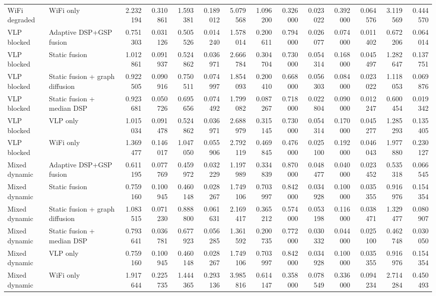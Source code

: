 \begin{tabular}{llrrrrrrrrrrrr}
WiFi degraded & WiFi only & 2.232194 & 0.310861 & 1.593381 & 0.189012 & 5.079568 & 1.096200 & 0.326000 & 0.023022 & 0.392000 & 0.064576 & 3.119569 & 0.444570 \\
VLP blocked & Adaptive DSP+GSP fusion & 0.751303 & 0.031126 & 0.505526 & 0.014240 & 1.578014 & 0.200611 & 0.794000 & 0.026077 & 0.074000 & 0.011402 & 0.672206 & 0.064014 \\
VLP blocked & Static fusion & 1.012861 & 0.091937 & 0.524862 & 0.036971 & 2.666784 & 0.304704 & 0.730000 & 0.054314 & 0.168000 & 0.045497 & 1.282647 & 0.137751 \\
VLP blocked & Static fusion + graph diffusion & 0.922505 & 0.090916 & 0.750511 & 0.074997 & 1.854093 & 0.200410 & 0.668000 & 0.056303 & 0.084000 & 0.023022 & 1.118053 & 0.069876 \\
VLP blocked & Static fusion + median DSP & 0.923681 & 0.050726 & 0.695656 & 0.074492 & 1.799082 & 0.087267 & 0.718000 & 0.022804 & 0.090000 & 0.012247 & 0.600454 & 0.019342 \\
VLP blocked & VLP only & 1.015034 & 0.091478 & 0.524862 & 0.036971 & 2.688979 & 0.315145 & 0.730000 & 0.054314 & 0.170000 & 0.045277 & 1.285293 & 0.135405 \\
VLP blocked & WiFi only & 1.369477 & 0.146017 & 1.047050 & 0.055906 & 2.792119 & 0.469845 & 0.476000 & 0.025100 & 0.192000 & 0.046043 & 1.977880 & 0.230127 \\
Mixed dynamic & Adaptive DSP+GSP fusion & 0.611195 & 0.077769 & 0.459972 & 0.032229 & 1.197989 & 0.334839 & 0.870000 & 0.048477 & 0.040000 & 0.023452 & 0.535318 & 0.066545 \\
Mixed dynamic & Static fusion & 0.759160 & 0.100945 & 0.460148 & 0.028267 & 1.749106 & 0.703997 & 0.842000 & 0.034928 & 0.100000 & 0.035355 & 0.916976 & 0.154354 \\
Mixed dynamic & Static fusion + graph diffusion & 1.083515 & 0.071230 & 0.888800 & 0.061631 & 2.169417 & 0.365212 & 0.574000 & 0.053198 & 0.116000 & 0.038471 & 1.329477 & 0.080907 \\
Mixed dynamic & Static fusion + median DSP & 0.793641 & 0.036781 & 0.677923 & 0.056285 & 1.361592 & 0.200735 & 0.772000 & 0.030332 & 0.044000 & 0.025100 & 0.462748 & 0.030050 \\
Mixed dynamic & VLP only & 0.759160 & 0.100945 & 0.460148 & 0.028267 & 1.749106 & 0.703997 & 0.842000 & 0.034928 & 0.100000 & 0.035355 & 0.916976 & 0.154354 \\
Mixed dynamic & WiFi only & 1.917644 & 0.225735 & 1.444365 & 0.293136 & 3.985816 & 0.614147 & 0.358000 & 0.078549 & 0.336000 & 0.094234 & 2.714284 & 0.450493 \\
\bottomrule
\end{tabular}
